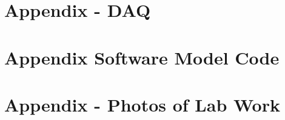 \documentclass[12pt,a4paper]{scrreprt}
\begin{document}
\onehalfspacing

\begin{titlepage}
    \maketitle
    \thispagestyle{empty}
\end{titlepage}

\tableofcontents
\thispagestyle{empty}
\clearpage

\listoffigures
\thispagestyle{empty}

\listoftables
\thispagestyle{empty}

\listofequations




\clearpage















\appendix
\chapter{Appendix - DAQ}


\chapter{Appendix Software Model Code}
\label{app:Software Model - Code}


\chapter{Appendix - Photos of Lab Work}

\end{document}
